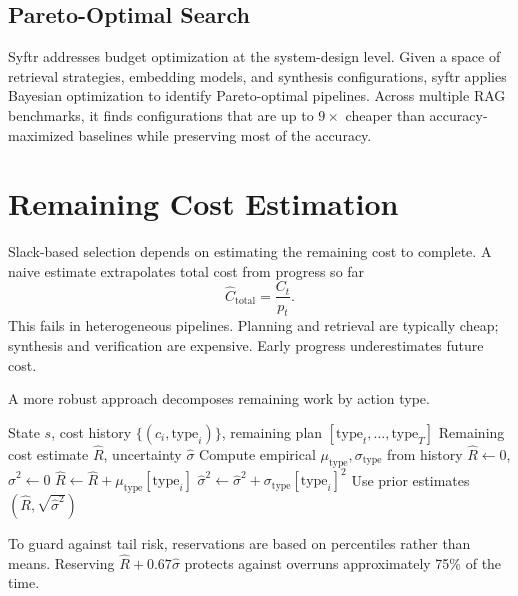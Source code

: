 \subsection{Pareto-Optimal Search}

Syftr \cite{dey2025syftr} addresses budget optimization at the system-design level. Given a space of retrieval strategies, embedding models, and synthesis configurations, syftr applies Bayesian optimization to identify Pareto-optimal pipelines. Across multiple RAG benchmarks, it finds configurations that are up to $9\times$ cheaper than accuracy-maximized baselines while preserving most of the accuracy.

\section{Remaining Cost Estimation}

Slack-based selection depends on estimating the remaining cost to complete. A naive estimate extrapolates total cost from progress so far
\[
\hat{C}_{\text{total}} = \frac{C_t}{p_t}.
\]
This fails in heterogeneous pipelines. Planning and retrieval are typically cheap; synthesis and verification are expensive. Early progress underestimates future cost.

A more robust approach decomposes remaining work by action type.

\begin{algorithm}
\caption{Type-Aware Remaining Cost Estimation}
\begin{algorithmic}[1]
\Require State $s$, cost history $\{(c_i, \text{type}_i)\}$, remaining plan $[\text{type}_t, \ldots, \text{type}_T]$
\Ensure Remaining cost estimate $\hat{R}$, uncertainty $\hat{\sigma}$
\State Compute empirical $\mu_{\text{type}}, \sigma_{\text{type}}$ from history
\State $\hat{R} \gets 0$, $\hat{\sigma}^2 \gets 0$
        \State $\hat{R} \gets \hat{R} + \mu_{\text{type}}[\text{type}_i]$
        \State $\hat{\sigma}^2 \gets \hat{\sigma}^2 + \sigma_{\text{type}}[\text{type}_i]^2$
    \Else
        \State Use prior estimates
    \EndIf
\EndFor
\State \Return $(\hat{R}, \sqrt{\hat{\sigma}^2})$
\end{algorithmic}
\end{algorithm}

To guard against tail risk, reservations are based on percentiles rather than means. Reserving $\hat{R} + 0.67\hat{\sigma}$ protects against overruns approximately 75\% of the time.

